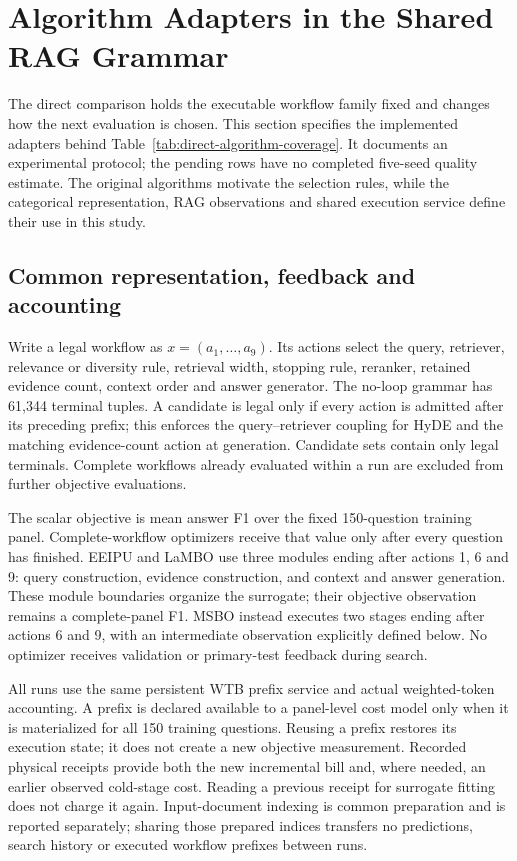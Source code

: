 \section{Algorithm Adapters in the Shared RAG Grammar}
\label{sec:rag-optimizer-adapters}

The direct comparison holds the executable workflow family fixed and changes
how the next evaluation is chosen. This section specifies the implemented
adapters behind Table~\ref{tab:direct-algorithm-coverage}. It documents an
experimental protocol; the pending rows have no completed five-seed quality
estimate. The original algorithms motivate the selection rules, while the
categorical representation, RAG observations and shared execution service
define their use in this study.

\subsection{Common representation, feedback and accounting}
\label{sec:adapter-common-contract}
Write a legal workflow as $x=(a_1,\ldots,a_9)$. Its actions select the query,
retriever, relevance or diversity rule, retrieval width, stopping rule,
reranker, retained evidence count, context order and answer generator.
The no-loop grammar has 61,344 terminal tuples. A candidate is legal only if
every action is admitted after its preceding prefix; this enforces the
query--retriever coupling for HyDE and the matching evidence-count action
at generation. Candidate sets contain only legal terminals. Complete
workflows already evaluated within a run are excluded from further
objective evaluations.

The scalar objective is mean answer F1 over the fixed 150-question training
panel. Complete-workflow optimizers receive that value only after every
question has finished. EEIPU and LaMBO use three modules ending after
actions 1, 6 and 9: query construction, evidence construction, and context
and answer generation. These module boundaries organize the surrogate;
their objective observation remains a complete-panel F1. MSBO instead
executes two stages ending after actions 6 and 9, with an intermediate
observation explicitly defined below. No optimizer receives validation or
primary-test feedback during search.

All runs use the same persistent WTB prefix service and actual weighted-token
accounting. A prefix is declared available to a panel-level cost model only
when it is materialized for all 150 training questions. Reusing a prefix
restores its execution state; it does not create a new objective measurement.
Recorded physical receipts provide both the new incremental bill and, where
needed, an earlier observed cold-stage cost. Reading a previous receipt for
surrogate fitting does not charge it again. Input-document indexing is
common preparation and is reported separately; sharing those prepared
indices transfers no predictions, search history or executed workflow
prefixes between runs.

